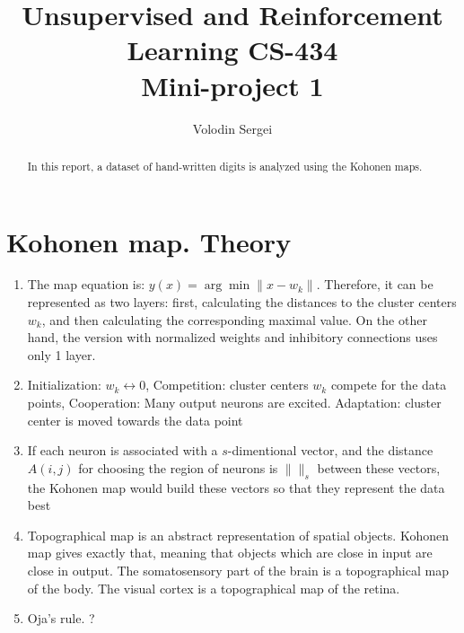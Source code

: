 \documentclass[12pt, twocolumn]{article}
\begin{document}
\title{Unsupervised and Reinforcement Learning CS-434\\Mini-project 1}

\author{Volodin Sergei}

\maketitle
\thispagestyle{empty}

\begin{abstract}
   In this report, a dataset of hand-written digits is analyzed using the Kohonen maps.
\end{abstract}

\section{Kohonen map. Theory}
\begin{enumerate}
\item The map equation is: $y(x)=\arg\min\|x-w_k\|$. Therefore, it can be represented as two layers: first, calculating the distances to the cluster centers $w_k$, and then calculating the corresponding maximal value. On the other hand, the version with normalized weights and inhibitory connections uses only 1 layer.
\item Initialization: $w_k\leftrightarrow 0$, Competition: cluster centers $w_k$ compete for the data points, Cooperation: Many output neurons are excited. Adaptation: cluster center is moved towards the data point
\item If each neuron is associated with a $s$-dimentional vector, and the distance $A(i,j)$ for choosing the region of neurons is $\|\|_s$ between these vectors, the Kohonen map would build these vectors so that they represent the data best
\item Topographical map is an abstract representation of spatial objects. Kohonen map gives exactly that, meaning that objects which are close in input are close in output. The somatosensory part of the brain is a topographical map of the body. The visual cortex is a topographical map of the retina.
\item Oja's rule. ?
\end{enumerate}
\end{document}
